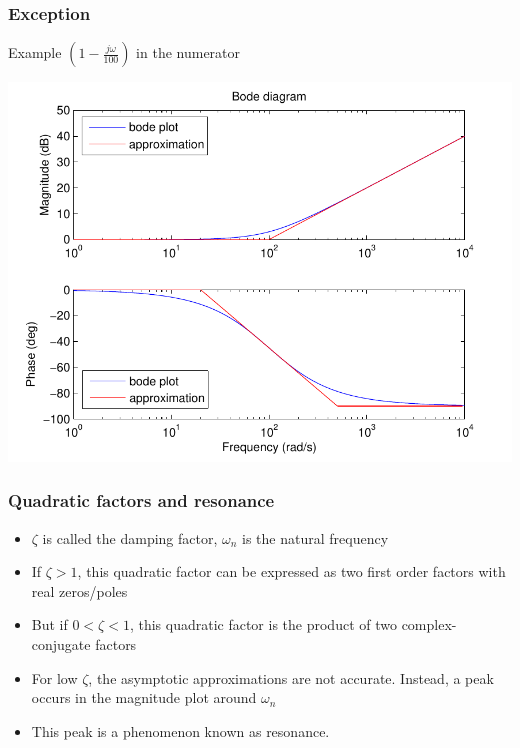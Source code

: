 \begin{frame}
\frametitle{Exception}
Example $(1 - \frac{j\omega}{100})$ in the numerator

\begin{center}
\includegraphics[scale=0.5]{BodeException}
\end{center}

\end{frame}


\begin{frame}
\frametitle{Quadratic factors and resonance}
\begin{itemize}
Also possible is a quadratic factor $[1 + 2\zeta(j\frac{\omega}{\omega_n}) +  (j\frac{\omega}{\omega_n})^2]^{\pm1}$
\item $\zeta$ is called the damping factor, $\omega_n$ is the natural frequency
\item If $\zeta > 1$, this quadratic factor can be expressed as two first order factors with real zeros/poles
\item But if $0 < \zeta < 1 $, this quadratic factor is the product of two complex-conjugate factors
\item For low $\zeta$, the asymptotic approximations are not accurate. Instead, a peak occurs in the magnitude plot around $\omega_n$
\item This peak is a phenomenon known as resonance. 
\end{itemize}

\end{frame}

